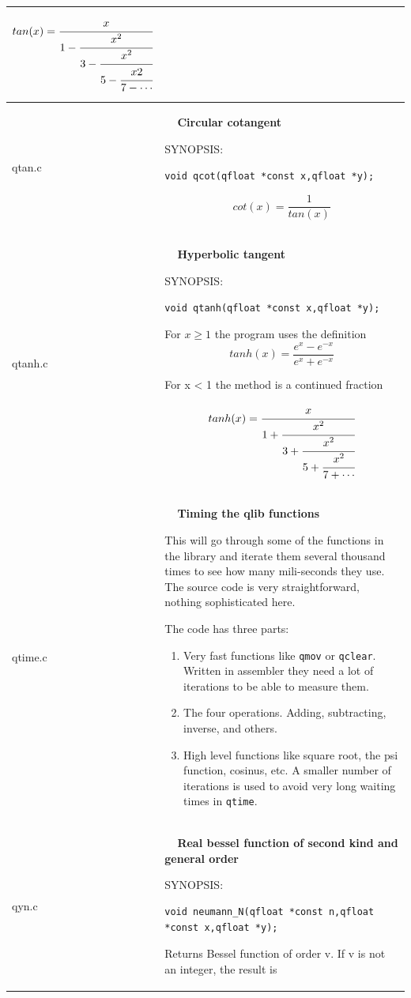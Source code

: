 \documentclass[10pt,a4paper,x11names]{memoir} %
\newcounter{entry}
\newcommand{\TOC}[1] {\addcontentsline{toc}{section}{\theentry\ \  #1} \textbf{\theentry\ \  #1} \par\stepcounter{entry}}
\begin{document}
\begin{longtable}{|p{1.5cm}|p{11.5cm}|}
	$$tan(x)=\cfrac{x}{1-\cfrac{x^2}{3-\cfrac{x^2}{5-\cfrac{x2}{7-\dotsb}}}}$$
	\\\hline
	qtan.c& \TOC{Circular cotangent}
	
	{\footnotesize SYNOPSIS:}\vspace{-0.2cm}\index{qcot}
	\begin{lstlisting}[numbers=none]
		void qcot(qfloat *const x,qfloat *y);
	\end{lstlisting}\vspace{-0.2cm}
	$$ cot(x)=\frac{1}{tan(x)}$$
	\\\hline
	qtanh.c& \TOC{Hyperbolic tangent}
	
	{\footnotesize SYNOPSIS:}\vspace{-0.2cm}\index{qtanh}
	\begin{lstlisting}[numbers=none]
		void qtanh(qfloat *const x,qfloat *y);
	\end{lstlisting}\vspace{-0.2cm}
	
	For $x \ge 1$ the program uses the definition
	$$ tanh(x)=\frac{e^x -e^{-x}}{e^x+e^{-x}}$$
	
	For x < 1 the method is a continued fraction
	
	$$tanh(x)=\cfrac{x}{1+\cfrac{x^2}{3+\cfrac{x^2}{5+\cfrac{x^2}{7+\dotsb}}}}$$
	\\\hline
	qtime.c& \TOC{Timing the qlib functions}\index{timing}
	
	This will go through some of the functions in the library and iterate them several thousand times to see how many mili-seconds they use. The source code is very straightforward, nothing sophisticated here.
	
	The code has three parts:
	\begin{enumerate}
		\item Very fast functions like \verb,qmov, or \verb,qclear,. Written in assembler they need a lot of iterations to be able to measure them.
		\item The four operations. Adding, subtracting, inverse, and others.
		\item High level functions like square root, the psi function, cosinus, etc. A smaller number of iterations is used to avoid very long waiting times in \verb,qtime,.
	\end{enumerate}
	\\\hline
	qyn.c& \TOC{Real bessel function of second kind and general order}
	
	{\footnotesize SYNOPSIS:}\vspace{-0.2cm}\index{neumann\_N}
	\begin{lstlisting}[numbers=none]
	void neumann_N(qfloat *const n,qfloat *const x,qfloat *y);
	\end{lstlisting}\vspace{-0.2cm}
	Returns Bessel function of order v.
	If v is not an integer, the result is
	

\end{longtable}
\end{document}
